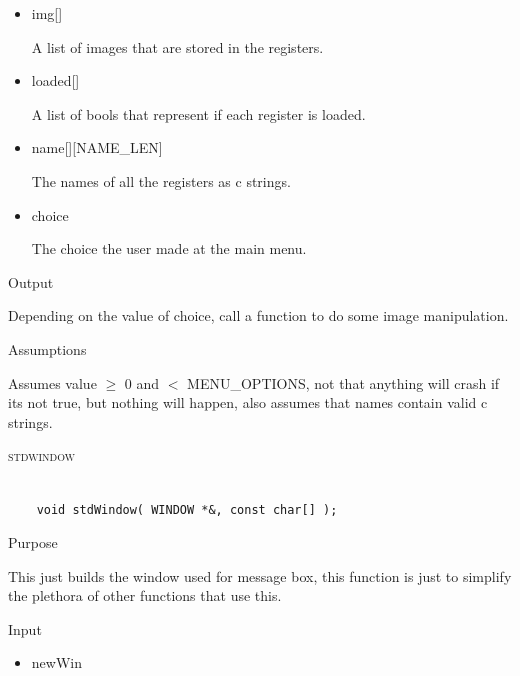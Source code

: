\documentclass[pdftex, 11pt]{article}
\begin{document}
\begin{description}
\begin{description}
				\begin{itemize}

					\item{img[]}

						A list of images that are stored in the registers.

					\item{loaded[]}

						A list of bools that represent if each register is loaded.

					\item{name[][NAME\_LEN]}

						The names of all the registers as c strings.

					\item{choice}
				
						The choice the user made at the main menu.

				\end{itemize}

			\item{Output}

				Depending on the value of choice, call a function to do some image
				manipulation.

			\item{Assumptions}

				Assumes value $\geq$ 0 and $<$ MENU\_OPTIONS, not that anything
				will crash if its not true, but nothing will happen, also
				assumes that names contain valid c strings.

		\end{description}



	\item{\textsc{stdwindow}}

		\begin{lstlisting}

	void stdWindow( WINDOW *&, const char[] );
		\end{lstlisting}

		\begin{description}
			\item{Purpose}

				This just builds the window used for message box, this function is just to
				simplify the plethora of other functions that use this.
				
			\item{Input}
				
				\begin{itemize}

					\item{newWin}


\end{itemize}
\end{description}
\end{description}
\end{document}

